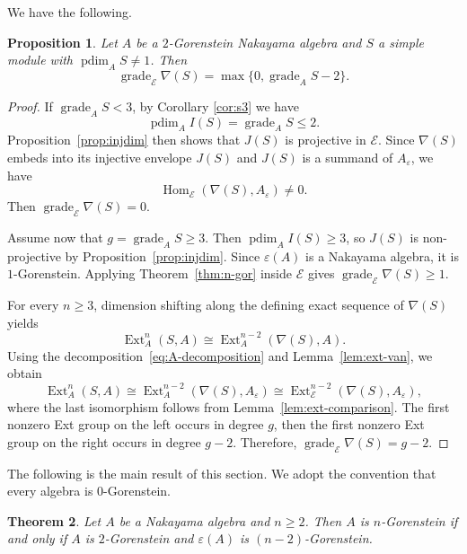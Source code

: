 \documentclass[a4paper,reqno]{amsart}
\numberwithin{equation}{section}
\theoremstyle{plain}
\newtheorem{thm}{Theorem}[section]
\newtheorem{prop}[thm]{Proposition}
\theoremstyle{definition}
\theoremstyle{remark}
\DeclareMathOperator{\Hom}{Hom}
\DeclareMathOperator{\Ext}{Ext}
\DeclareMathOperator{\grade}{grade}
\DeclareMathOperator{\pdim}{pdim}
\renewcommand{\-}{\mbox{-}}
\newcommand{\scE}{\mathcal{E}}
\begin{document}
We have the following.

\begin{prop}  \label{prop:grade}
Let \(A\) be a \(2\)-Gorenstein Nakayama algebra 
and \(S\) a simple module  with  $\pdim_AS\neq 1$. Then 
\begin{equation*}
    \grade_{\scE}\nabla(S)=\max\{0,\grade_AS-2\}.
\end{equation*}
\end{prop}


\begin{proof}
If \(\grade_AS<3\), by Corollary \ref{cor:s3} we have
\begin{equation*}
    \pdim_AI(S)=\grade_AS\le 2.
\end{equation*}
Proposition~\ref{prop:injdim} then shows that $J(S)$ is projective in $\scE$.
Since $\nabla(S)$ embeds into its injective envelope $J(S)$ and $J(S)$ is a
summand of $A_\varepsilon$, we have
\[\Hom_{\scE}(\nabla(S),A_\varepsilon)\neq0.\] 
Then $\grade_{\scE}\nabla(S)=0$.

Assume now that $g=\grade_AS\geq3$. Then $\pdim_AI(S)\geq3$, so
$J(S)$ is non-projective by Proposition~\ref{prop:injdim}. Since
$\varepsilon(A)$ is a Nakayama algebra, it is $1$-Gorenstein. Applying
Theorem~\ref{thm:n-gor} inside $\scE$ gives
$\grade_{\scE}\nabla(S)\geq1$.

For every $n\geq3$, dimension shifting along the defining exact sequence of
$\nabla(S)$ yields
\[
  \Ext_A^n(S,A)\cong\Ext_A^{n-2}(\nabla(S),A).
\]
Using the decomposition~\eqref{eq:A-decomposition} and
Lemma~\ref{lem:ext-van}, we obtain
\[
  \Ext_A^n(S,A)
  \cong\Ext_A^{n-2}(\nabla(S),A_\varepsilon)
  \cong\Ext_{\scE}^{n-2}(\nabla(S),A_\varepsilon),
\]
where the last isomorphism follows from Lemma~\ref{lem:ext-comparison}.
The first nonzero Ext group on the left occurs in degree $g$, 
then the first
nonzero Ext group on the right occurs in degree $g-2$. 
Therefore,
$\grade_{\scE}\nabla(S)=g-2$.
\end{proof}



The following is the main result of this section.
We adopt the convention that every  algebra is 0-Gorenstein.


\begin{thm} \label{thm:nak-n-gor}
Let \(A\) be a Nakayama algebra and \(n\ge 2\). 
Then \(A\) is \(n\)-Gorenstein if and only if 
\(A\) is \(2\)-Gorenstein and \(\varepsilon(A)\) is \((n-2)\)-Gorenstein.
\end{thm}
\end{document}
